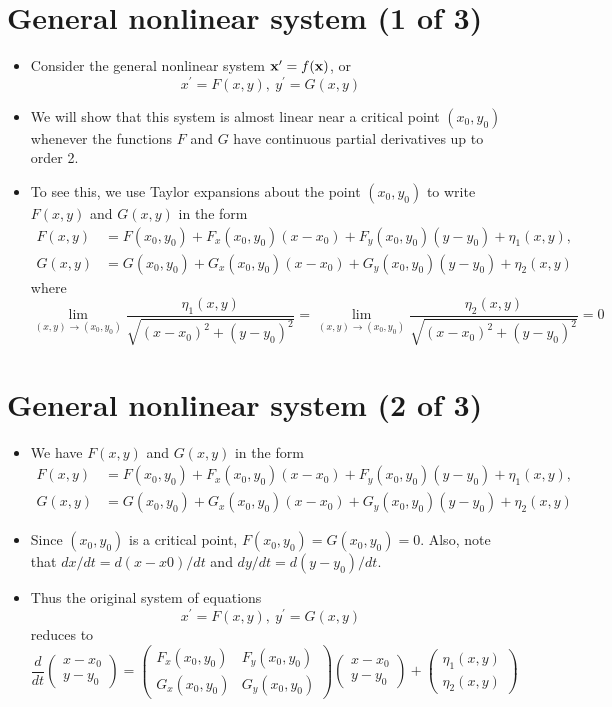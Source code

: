 \documentclass[11pt,a4paper]{article}
\begin{document}
	\section*{General nonlinear system (1 of 3)}
	\begin{itemize}
		\item Consider the general nonlinear system $\vb{x}^\prime = f(\vb{x})$, or
		$$
		x^\prime = F(x,y),\ y^\prime = G(x,y)
		$$
		\item We will show that this system is almost linear near a critical point $(x_0, y_0)$ whenever the functions $F$ and $G$ have continuous partial derivatives up to order 2.
		\item To see this, we use Taylor expansions about the point $(x_0, y_0)$ to write $F(x,y)$ and $G(x,y)$ in the form
		\begin{align*}
			F(x,y) &= F(x_0, y_0) + F_x(x_0, y_0)(x-x_0)+F_y(x_0, y_0)(y-y_0) + \eta_1(x,y),\\
			G(x,y) &= G(x_0, y_0) + G_x(x_0, y_0)(x-x_0)+G_y(x_0, y_0)(y-y_0) + \eta_2(x,y)
		\end{align*}
		where
		$$
		\lim_{(x,y)\to (x_0,y_0)}\frac{\eta_1(x,y)}{\sqrt{(x-x_0)^2 + (y-y_0)^2}} = \lim_{(x,y)\to (x_0,y_0)}\frac{\eta_2 (x,y)}{\sqrt{(x-x_0)^2+(y-y_0)^2}} = 0
		$$
	\end{itemize}
	\section*{General nonlinear system (2 of 3)}
	\begin{itemize}
		\item We have $F(x,y)$ and $G(x,y)$ in the form
		\begin{align*}
			F(x,y) &= F(x_0, y_0) + F_x(x_0, y_0)(x-x_0)+F_y(x_0, y_0)(y-y_0) + \eta_1(x,y),\\
			G(x,y) &= G(x_0, y_0) + G_x(x_0, y_0)(x-x_0)+G_y(x_0, y_0)(y-y_0) + \eta_2(x,y)
		\end{align*}
		\item Since $(x_0, y_0)$ is a critical point, $F(x_0, y_0) = G(x_0, y_0) = 0$. Also, note that $dx/dt = d(x - x0)/dt$ and $dy/dt = d(y - y_0)/dt$.
		\item Thus the original system of equations
		$$
		x^\prime = F(x,y),\ y^\prime = G(x,y)
		$$
		reduces to
		$$
		\frac{d}{dt}
		\begin{pmatrix}
			x-x_0\\
			y-y_0
		\end{pmatrix}=
		\begin{pmatrix}
			F_x(x_0, y_0) & F_y(x_0, y_0)\\
			G_x(x_0, y_0) & G_y(x_0, y_0)
		\end{pmatrix}
		\begin{pmatrix}
			x-x_0\\
			y-y_0
		\end{pmatrix} +
		\begin{pmatrix}
			\eta_1(x,y)\\
			\eta_2(x,y)
		\end{pmatrix}
		$$
	\end{itemize}
\end{document}
